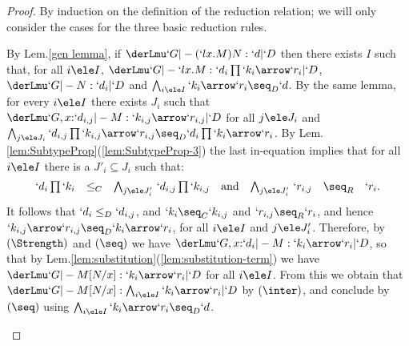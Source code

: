 \documentclass{lmcs}
\begin{document}
 \begin{proof} %
By induction on the definition of the reduction relation; we will only consider the cases for the three basic reduction rules.

 \begin{description} \itemsep 2pt

 \item [{$(`l x . M ) N \red M [ N /x ] $}] 
By Lem.\skp\ref{gen lemma}, if $\derLmu `G |- {(`l x . M ) N} : `d | `D $ then there exists $I$ such that, for all $i\ele I$, $\derLmu `G |- {`l x . M} : `d_i\prod `k_i\arrow `r_i | `D $, $\derLmu `G |- N : `d_i | `D $ and $\bigwedge_{i\ele I} `k_i\arrow `r_i \seq_D `d$. 
By the same lemma, for every $i \ele I$ there exists $J_i$ such that $\derLmu `G, x{:} `d_{i,j} |- M : `k_{i,j}\arrow `r_{i,j} | `D $ for all $j\ele J_i$ and $\bigwedge_{j\ele J_i} `d_{i,j}\prod `k_{i,j}\arrow `r_{i,j} \seq_D `d_i\prod `k_i\arrow `r_i $.
By Lem.\skp\ref{lem:SubtypeProp}\skp(\ref{lem:SubtypeProp-3}) the last in-equation implies that for all $i\ele I$ there is a $J'_i \subseteq J_i$ such that:
 \[ \begin{array}{rcl@{\quad}c@{\quad}rcl}
`d_i\prod `k_i &\leq_C& \bigwedge_{j\ele J'_i}\,`d_{i,j}\prod `k_{i,j} 
	&\textrm{and}&
\bigwedge_{j\ele J'_i}\,`r_{i,j} &\seq_R& `r_i.
 \end{array} \]
It follows that $`d_i \leq_D `d_{i,j}$, and $ `k_i \seq_C `k_{i,j}$ and $`r_{i,j} \seq_R `r_i$, and hence $`k_{i,j}\arrow `r_{i,j} \seq_D `k_i\arrow `r_i$, for all $i\ele I$ and $j\ele J'_i$.
Therefore, by $(\Strength)$ and $(\seq)$ we have $\derLmu `G, x{:} `d_i |- {M} : `k_i\arrow `r_i | `D $, so that by Lem.\skp\ref{lem:substitution}\skp(\ref{lem:substitution-term}) we have $\derLmu `G |- {M[N/x]} : `k_i\arrow `r_i | `D $ for all $i\ele I$.
From this we obtain that $\derLmu `G |- {M[N/x]} : \bigwedge_{i\ele I} `k_i\arrow `r_i | `D $ by $(\inter)$, and conclude by $(\seq)$ using $\bigwedge_{i\ele I} `k_i\arrow `r_i \seq_D `d$.



\end{description}
\end{proof}
\end{document}
